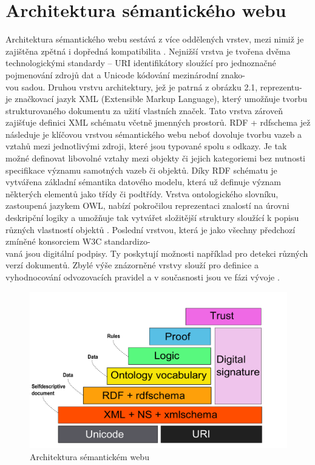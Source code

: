 \documentclass{projekt}
\begin{document}
\section{Architektura sémantického webu}
\hspace{0.65cm}Architektura sémantického webu sestává z více oddělených vrstev, mezi nimiž je zajištěna zpětná i dopředná kompatibilita \cite{_3}. Nejnižší vrstva je tvořena dvěma technologickými standardy – URI identifikátory sloužící pro jednoznačné pojmenování zdrojů dat a Unicode kódování mezinárodní znako-\\vou sadou. Druhou vrstvu architektury, jež je patrná z obrázku 2.1, reprezentu-\\je značkovací jazyk XML (Extensible Markup Language), který umožňuje tvorbu strukturovaného dokumentu za užití vlastních značek. Tato vrstva zároveň zajišťuje definici XML schématu včetně jmenných prostorů. RDF + rdfschema jež následuje je klíčovou vrstvou sémantického webu neboť dovoluje tvorbu vazeb a vztahů mezi jednotlivými zdroji, které jsou typované spolu s odkazy. Je tak možné definovat libovolné vztahy mezi objekty či jejich kategoriemi bez nutnosti specifikace významu samotných vazeb či objektů. Díky RDF schématu je vytvářena základní sémantika datového modelu, která už definuje význam některých elementů jako třídy či podtřídy. 
Vrstva ontologického slovníku, zastoupená jazykem OWL, nabízí pokročilou reprezentaci znalostí na úrovni deskripční logiky a umožňuje tak vytvářet složitější struktury sloužící k popisu různých vlastností objektů \cite{_2}. Poslední vrstvou, která je jako všechny předchozí zmíněné konsorciem W3C standardizo-\\vaná jsou digitální podpisy. Ty poskytují možnosti například pro detekci různých verzí dokumentů. Zbylé výše znázorněné vrstvy slouží pro definice a vyhodnocování odvozovacích pravidel a v současnosti jsou ve fázi vývoje \cite{_1}.

\begin{figure}[htb]
\begin{center}
\includegraphics[scale=0.62]{architektura.pdf}
\caption{Architektura sémantickém webu \cite{_1}}
\end{center}
\end{figure}
\end{document}
